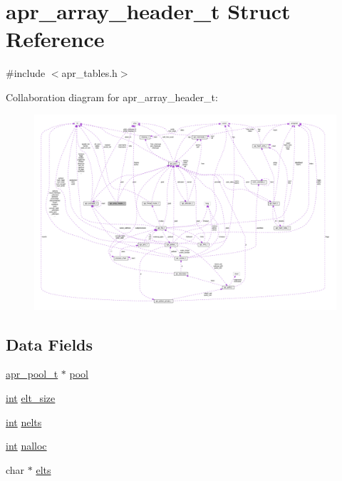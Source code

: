 \hypertarget{structapr__array__header__t}{}\section{apr\+\_\+array\+\_\+header\+\_\+t Struct Reference}
\label{structapr__array__header__t}


{\ttfamily \#include $<$apr\+\_\+tables.\+h$>$}



Collaboration diagram for apr\+\_\+array\+\_\+header\+\_\+t\+:
\nopagebreak
\begin{figure}[H]
\begin{center}
\leavevmode
\includegraphics[width=350pt]{structapr__array__header__t__coll__graph}
\end{center}
\end{figure}
\subsection*{Data Fields}
\begin{DoxyCompactItemize}
\item 
\hyperlink{structapr__pool__t}{apr\+\_\+pool\+\_\+t} $\ast$ \hyperlink{structapr__array__header__t_a68f353ce65943172fcc9494aa9f6e424}{pool}
\item 
\hyperlink{pcre_8txt_a42dfa4ff673c82d8efe7144098fbc198}{int} \hyperlink{structapr__array__header__t_a36a690ebc781edc9e99ac1bec53c1770}{elt\+\_\+size}
\item 
\hyperlink{pcre_8txt_a42dfa4ff673c82d8efe7144098fbc198}{int} \hyperlink{structapr__array__header__t_ab11b88220885c5a0920a06ac85680055}{nelts}
\item 
\hyperlink{pcre_8txt_a42dfa4ff673c82d8efe7144098fbc198}{int} \hyperlink{structapr__array__header__t_a0ceb78a23ebef1bceea5f0cd3e1513b6}{nalloc}
\item 
char $\ast$ \hyperlink{structapr__array__header__t_af8462fa2a1ddf6406c66cd3dd441a269}{elts}
\end{DoxyCompactItemize}


